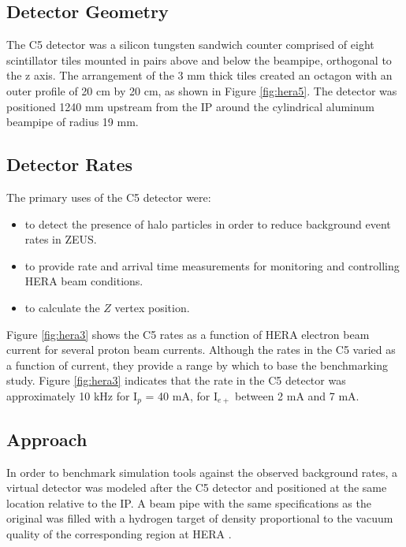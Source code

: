 \subsection{Detector Geometry}

The C5 detector was a silicon tungsten sandwich counter comprised of eight scintillator tiles mounted in pairs above and below the beampipe, orthogonal to the z axis.  The arrangement of the 3 mm thick tiles created an octagon with an outer profile of 20 cm by 20 cm, as shown in Figure \ref{fig:hera5}.  The detector was positioned 1240 mm upstream from the IP around the cylindrical aluminum beampipe of radius 19 mm.  

\subsection{Detector Rates}
The primary uses of the C5 detector were:
\begin{itemize}
	\item to detect the presence of halo particles in order to reduce background event rates in ZEUS.
	\item to provide rate and arrival time measurements for monitoring and controlling HERA beam conditions.
	\item to calculate the $Z$ vertex position.
\end{itemize}
Figure \ref{fig:hera3} shows the C5 rates as a function of HERA electron beam current for several proton beam currents.  Although the rates in the C5 varied as a function of current, they provide a range by which to base the benchmarking study.  Figure \ref{fig:hera3} indicates that the rate in the C5 detector was approximately 10 kHz for I$_{p}$ = 40 mA, for I$_{e+}$ between 2 mA and 7 mA. 

\subsection{Approach}

In order to benchmark simulation tools against the observed background rates, a virtual detector was modeled after the C5 detector and positioned at the same location relative to the IP.  A beam pipe with the same specifications as the original was filled with a hydrogen target of density proportional to the vacuum quality of the corresponding region at HERA \cite{ZEUS:1993}.

